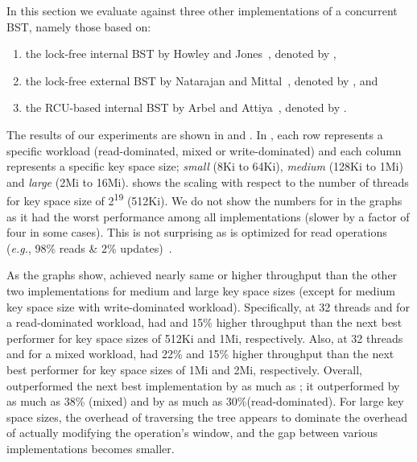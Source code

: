 In this section we evaluate \ICDCN{} against three other implementations of a concurrent BST, namely those based on:
\begin{enumerate}[label=(\roman*)]
\item the lock-free internal BST by Howley and Jones~\cite{HowJon:2012:SPAA}, denoted by \HJBST{},
\item the lock-free external BST by Natarajan and Mittal~\cite{NatMit:2014:PPoPP}, denoted by \NMBST{}, and 
\item the RCU-based internal BST by Arbel and Attiya~\cite{ArbAtt:2014:PODC}, denoted by \CITRUS{}.
\end{enumerate}




The results of our experiments are shown in  and . In , each row represents a specific workload (read-dominated, mixed or write-dominated) and each column represents a specific key space size; \textit{small} (8Ki to 64Ki), \textit{medium} (128Ki to 1Mi) and \textit{large} (2Mi to 16Mi).  shows the scaling with respect to the number of threads for key space size of 2\textsuperscript{19} (512Ki). We do not show the numbers for \CITRUS{} in the graphs as it had the worst performance among all implementations (slower by a factor of four in some cases). This is not surprising as \CITRUS{} is optimized for read operations (\emph{e.g.}, 98\% reads \& 2\% updates)~\cite{ArbAtt:2014:PODC}.


As the graphs show, \ICDCN{} achieved nearly same or higher throughput than the other two implementations for medium and large key space sizes (except for medium key space size with write-dominated workload). Specifically, at 32 threads and for a read-dominated workload, \ICDCN{} had \icdcnMaximumgap{} and 15\% higher throughput than the next best performer for key space sizes of 512Ki and 1Mi, respectively. Also, at 32 threads and for a mixed workload, \ICDCN{} had 22\% and 15\% higher throughput than the next best performer for key space sizes of 1Mi and 2Mi, respectively. Overall, \ICDCN{} outperformed the next best implementation by as much as \icdcnMaximumgap{}; it outperformed \HJBST{} by as much as 38\% (mixed) and \NMBST{} by as much as 30\%(read-dominated). For large key space sizes, the overhead of traversing the tree appears to dominate the overhead of actually modifying the operation's window, and the gap between various implementations becomes smaller.

